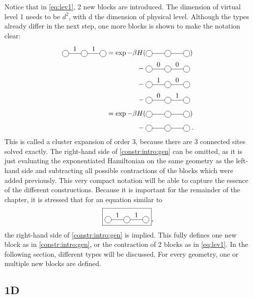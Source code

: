 \documentclass[twocolumn]{article}
\newcounter{a}
\newcounter{b}
\begin{document}
Notice that in \cref{eq:lev1}, 2 new blocks are introduced. The dimension of virtual level 1 needs to be $d^2$, with d the dimension of physical level. Although the types already differ in the next step, one more blocks is shown to make the notation clear:
\begin{equation}\label{constr:intro:gen}
    \begin{split}
        \mpob{3}{ {0,1,1,0}  }{}{}{}{{,,,}}  = \exp  -\beta H( &\mpob{3}{ {,,,} }{}{}{}{{,,}})  \\
        - \;&\mpob{3}{ {0,0,0,0}  }{}{}{}{{,,,}}\\
        - \; &\mpob{3}{ {0,1,0,0}  }{}{}{}{{,,,}}\\
        - \; &\mpob{3}{ {0,0,1,0}  }{}{}{}{{,,,}}\\[4pt]
        =\exp  -\beta H( &\mpob{3}{ {,,,} }{}{}{}{{,,}})\\[4pt]
        - \; &\mpob{3}{ {,,,}  }{}{}{}{{,,,}} \; .
    \end{split}
\end{equation}
This is called a cluster expansion of order 3, because there are 3 connected sites solved exactly. The right-hand side of \cref{constr:intro:gen} can be omitted, as it is just evaluating the exponentiated Hamiltonian on the same geometry as the left-hand side and subtracting all possible contractions of the blocks which were added previously. This very compact notation will be able to capture the essence of the different constructions. Because it is important for the remainder of the chapter, it is stressed that for an equation similar to
\begin{equation}
    \boxed{\mpob{3}{ {0,1,1,0}  }{}{}{}{{,,,}} },
\end{equation}
the right-hand side of \cref{constr:intro:gen} is implied. This fully defines one new block as in \cref{constr:intro:gen}, or the contraction of 2 blocks as in \cref{eq:lev1}. In the following section, different types will be discussed. For every geometry, one or multiple new blocks are defined.

\subsection{1D}
\end{document}

